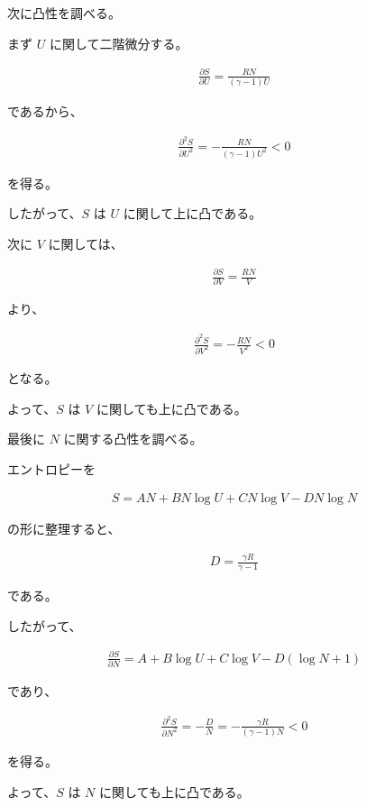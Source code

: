 \documentclass[platex,dvipdfmx,a4paper]{jsarticle}
\begin{document}
次に凸性を調べる。

まず $U$ に関して二階微分する。

\begin{align*}
\frac{\partial S}{\partial U}
=
\frac{RN}{(\gamma-1)U}
\end{align*}

であるから、

\begin{align*}
\frac{\partial^2S}{\partial U^2}
=
-\frac{RN}{(\gamma-1)U^2}
<
0
\end{align*}

を得る。

したがって、$S$ は $U$ に関して上に凸である。

次に $V$ に関しては、

\begin{align*}
\frac{\partial S}{\partial V}
=
\frac{RN}{V}
\end{align*}

より、

\begin{align*}
\frac{\partial^2S}{\partial V^2}
=
-\frac{RN}{V^2}
<
0
\end{align*}

となる。

よって、$S$ は $V$ に関しても上に凸である。

最後に $N$ に関する凸性を調べる。

エントロピーを

\begin{align*}
S
=
AN
+
BN\log U
+
CN\log V
-
DN\log N
\end{align*}

の形に整理すると、

\begin{align*}
D
=
\frac{\gamma R}{\gamma-1}
\end{align*}

である。

したがって、

\begin{align*}
\frac{\partial S}{\partial N}
=
A+B\log U+C\log V-D(\log N+1)
\end{align*}

であり、

\begin{align*}
\frac{\partial^2S}{\partial N^2}
=
-\frac{D}{N}
=
-\frac{\gamma R}{(\gamma-1)N}
<
0
\end{align*}

を得る。

よって、$S$ は $N$ に関しても上に凸である。
\end{document}
